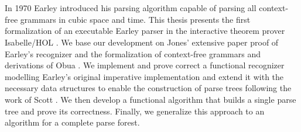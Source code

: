 \documentclass[headsepline,footsepline,footinclude=false,oneside,fontsize=11pt,paper=a4,listof=totoc,bibliography=totoc]{scrbook} %
\begin{document}
\chapter{\abstractname}

In 1970 Earley \cite{Earley:1970} introduced his parsing algorithm capable of parsing all context-free grammars in cubic
space and time. This thesis presents the first formalization of an executable Earley parser in the interactive
theorem prover Isabelle/HOL \cite{Nipkow:2002}. We base our development on Jones' \cite{Jones:1972}
extensive paper proof of Earley's recognizer and the formalization of context-free grammars
and derivations of Obua \cite{Obua:2017}. We implement and prove correct a functional recognizer modelling Earley's
original imperative implementation and extend it with the necessary data structures to enable the construction
of parse trees following the work of Scott \cite{Scott:2008}. We then develop a functional algorithm that
builds a single parse tree and prove its correctness. Finally, we generalize this approach to an algorithm
for a complete parse forest.

\tableofcontents{}

\mainmatter{}




\printbibliography{}
\end{document}
